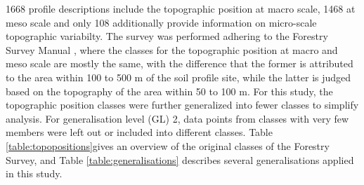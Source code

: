 \documentclass[final,1p,times,twocolumn,authoryear]{elsarticle}
\begin{document}
1668 profile descriptions include  the topographic position at macro scale, 1468 at meso scale and only 108 additionally provide information on micro-scale topographic variabilty. The survey was performed adhering to the Forestry Survey Manual \citep{Englisch1998}, where the classes for the topographic position at macro and meso scale are mostly the same, with the difference that the former is attributed to the area within 100 to 500 m of the soil profile site, while the latter is judged based on the topography of the area within 50 to 100 m. For this study, the topographic position classes were further generalized into fewer classes to simplify  analysis. For generalisation level (GL) 2, data points from classes with very few members were left out or included into different classes. Table \ref{table:topopositions}gives an overview of the original classes of the Forestry Survey, and Table \ref{table:generalisations} describes several generalisations applied in this study.
\end{document}
